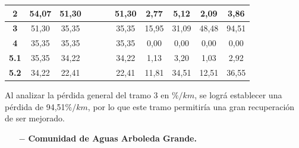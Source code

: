 \documentclass[]{article}
\begin{document}
\begin{landscape}
\begin{table}[H]
{\begin{tabular}{|c|c|c|c|c|c|c|c|c|c|c|}
\textbf{2} & 54,07 & 51,30 & & & & 51,30 & 2,77 & 5,12 & 2,09 & 3,86  \\ \hline
\textbf{3} & 51,30 & 35,35 & & & & 35,35 & 15,95 & 31,09 & 48,48 & 94,51  \\ \hline
\textbf{4} & 35,35 & 35,35 & & & & 35,35 & 0,00 & 0,00 & 0,00 & 0,00   \\ \hline
\textbf{5.1} & 35,35 & 34,22 & & & & 34,22 & 1,13 & 3,20 & 1,03 & 2,92  \\ \hline
\textbf{5.2} & 34,22 & 22,41 & & & & 22,41 & 11,81 & 34,51 & 12,51 & 36,55 \\ \hline     
\end{tabular}
}
\end{table}

Al analizar la pérdida general del tramo 3 en $\%/km$, se lográ establecer una pérdida de 94,51$\%/km$, por lo que este tramo permitiría una gran recuperación de ser mejorado. 

\clearpage
\begin{itemize}
	\item[$-$] \textbf{Comunidad de Aguas Arboleda Grande.}
\end{itemize}


\end{landscape}
\end{document}
